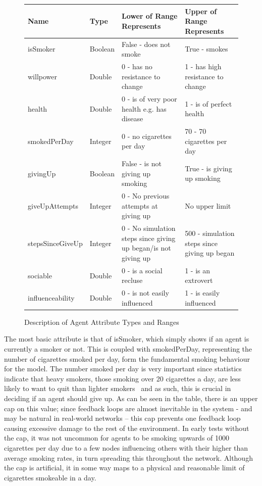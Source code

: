 \documentclass[]{report}
\begin{document}
\begin{figure}
\begin{center}
\label{tab:attr}
\begin{tabular}{|l||l|p{5cm}|p{5cm}|}
\hline
\bf{Name} & \bf{Type} & \bf{Lower of Range Represents} & \bf{Upper of Range Represents} \\
\hline
isSmoker 					& Boolean & False - does not smoke											& True - smokes \\
willpower					&	Double	&	0 - has no resistance to change							& 1 - has high resistance to change \\
health						&	Double	&	0 - is of very poor health e.g. has disease &	1 - is of perfect health \\
smokedPerDay			&	Integer	&	0 - no cigarettes per day										& 70 - 70 cigarettes per day \\
givingUp					&	Boolean	&	False - is not giving up smoking						& True - is giving up smoking \\
giveUpAttempts		&	Integer	&	0 - No previous attempts at giving up				& No upper limit \\
stepsSinceGiveUp	&	Integer	&	0 - No simulation steps since giving up began/is not giving up	& 500 - simulation steps since giving up began \\
sociable					&	Double	&	0 - is a social recluse											& 1	- is an extrovert \\
influenceability	&	Double	&	0 - is not easily influenced								& 1 - is easily influenced \\
\hline

\end{tabular}
\end{center}
\caption{Description of Agent Attribute Types and Ranges}
\end{figure}


The most basic attribute is that of isSmoker, which simply shows if an agent is currently a smoker or not. This is coupled with smokedPerDay, representing the number of cigarettes smoked per day, form the fundamental smoking behaviour for the model. The number smoked per day is very important since statistics indicate that heavy smokers, those smoking over 20 cigarettes a day, are less likely to want to quit than lighter smokers~\cite{NHS-43} and as such, this is crucial in deciding if an agent should give up. As can be seen in the table, there is an upper cap on this value; since feedback loops are almost inevitable in the system  - and may be natural in real-world networks – this cap prevents one feedback loop causing excessive damage to the rest of the environment. In early tests without the cap, it was not uncommon for agents to be smoking upwards of 1000 cigarettes per day due to a few nodes influencing others with their higher than average smoking rates, in turn spreading this throughout the network. Although the cap is artificial, it in some way maps to a physical and reasonable limit of cigarettes smokeable in a day.
\end{document}
